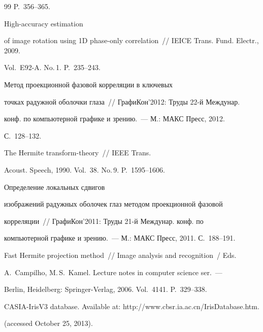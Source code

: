 {{\begin{thebibliography}{99}
P.~356--365.




 High-accuracy estimation 


of image rotation using 1D phase-only correlation~/\!\!/ IEICE Trans. Fund. Electr., 2009. 


Vol.~E92-A. No.\,1. P.~235--243.




 Метод проекционной фазовой корреляции в ключевых 


точках радужной оболочки глаза~/\!\!/ ГрафиКон'2012: Труды 22-й Междунар. 


конф. по компьютерной графике и зрению.~--- М.: МАКС Пресс, 2012. 


С.~128--132.




 The Hermite transform-theory~/\!\!/ IEEE Trans. 


Acoust. Speech, 1990. Vol.~38. No.\,9. P.~1595--1606.




 Определение локальных сдвигов 


изображений радужных оболочек глаз методом проекционной фазовой 


корреляции~/\!\!/ ГрафиКон'2011: Труды 21-й Междунар. конф. по 


компьютерной графике и зрению.~--- М.: МАКС Пресс, 2011. С.~188--191.




 Fast Hermite projection method~/\!\!/ Image analysis and recognition~/ Eds.


A.~Campilho, M.\,S.~Kamel. Lecture notes in computer science ser.~---


Berlin, Heidelberg: Springer-Verlag, 2006. Vol.~4141. P.~329--338.




CASIA-IrisV3 database. Available at: {\sf http://www.cbsr.ia.ac.cn/IrisDatabase.htm}.


(accessed October 25, 2013).











 \end{thebibliography}


} }








